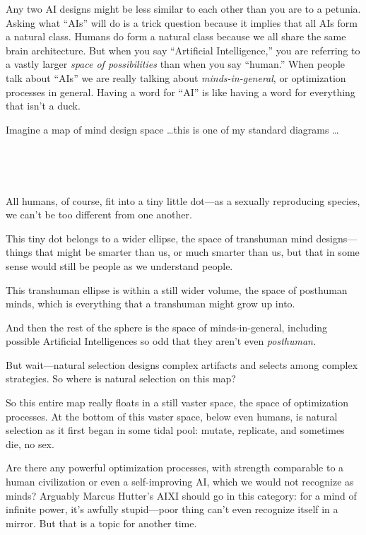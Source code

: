 {
 Any two AI designs might be less similar to each other than you
are to a petunia. Asking what
``AIs'' will do is a trick question
because it implies that all AIs form a natural class. Humans do form a
natural class because we all share the same brain architecture. But
when you say ``Artificial
Intelligence,'' you are referring to a vastly larger
\textit{space of possibilities} than when you say
``human.'' When people talk about
``AIs'' we are really talking about
\textit{minds-in-general}, or optimization processes in general. Having
a word for ``AI'' is like having a
word for everything that isn't a duck.}

{
 Imagine a map of mind design space \ldots this is one of my
standard diagrams \ldots}

{
 ~}

{\centering
{}
 
\par}


\bigskip

{
 ~}

{
 All humans, of course, fit into a tiny little dot---as a sexually
reproducing species, we can't be too different from one
another.}

{
 This tiny dot belongs to a wider ellipse, the space of transhuman
mind designs---things that might be smarter than us, or much smarter
than us, but that in some sense would still be people as we understand
people.}

{
 This transhuman ellipse is within a still wider volume, the space
of posthuman minds, which is everything that a transhuman might grow up
into.}

{
 And then the rest of the sphere is the space of minds-in-general,
including possible Artificial Intelligences so odd that they
aren't even \textit{posthuman.}}

{
 But wait---natural selection designs complex artifacts and selects
among complex strategies. So where is natural selection on this map?}

{
 So this entire map really floats in a still vaster space, the
space of optimization processes. At the bottom of this vaster space,
below even humans, is natural selection as it first began in some tidal
pool: mutate, replicate, and sometimes die, no sex.}

{
 Are there any powerful optimization processes, with strength
comparable to a human civilization or even a self-improving AI, which
we would not recognize as minds? Arguably Marcus
Hutter's AIXI should go in this category: for a mind of
infinite power, it's awfully stupid---poor thing
can't even recognize itself in a mirror. But that is a
topic for another time.}

